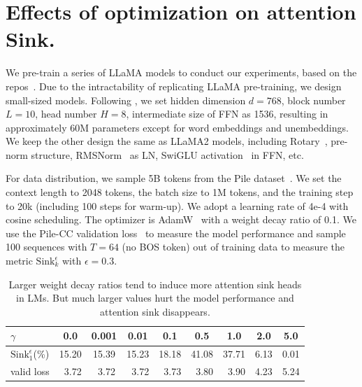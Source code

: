 
\vspace{-0.3cm}
\section{Effects of {\color{cc1}optimization} on attention Sink.}
\vspace{-0.25cm}
\label{sec4}


We pre-train a series of LLaMA models to conduct our experiments, based on the repos~\citep{zhang2024tinyllama,liu2024regmix}. Due to the intractability of replicating LLaMA pre-training, we design small-sized models. Following \citet{liu2024regmix}, we set hidden dimension $d=\textrm{768}$, block number $L=\textrm{10}$, head number $H=\textrm{8}$, intermediate size of FFN as 1536, resulting in approximately 60M parameters except for word embeddings and unembeddings. We keep the other design the same as LLaMA2 models, including Rotary~\citep{su2024roformer}, pre-norm structure, RMSNorm~\citep{zhang2019root} as LN, SwiGLU activation~\citep{shazeer2020glu} in FFN, etc.

For data distribution, we sample 5B tokens from the Pile dataset~\citep{gao2020pile}. We set the context length to 2048 tokens, the batch size to 1M tokens, and the training step to 20k (including 100 steps for warm-up). We adopt a learning rate of 4e-4 with cosine scheduling. The optimizer is AdamW~\citep{loshchilov2017decoupled} with a weight decay ratio of 0.1. We use the Pile-CC validation loss~\citep{gao2020pile,liu2024regmix} to measure the model performance and sample 100 sequences with $T=64$ (no BOS token) out of training data to measure the metric $\textrm{Sink}_k^\epsilon$ with $\epsilon=\textrm{0.3}$.  




\begin{table}[t]
\vspace{-1.1cm}
\caption{Larger weight decay ratios tend to induce more attention sink heads in LMs. But much larger values hurt the model performance and attention sink disappears.}
\vspace{-.4cm}
\begin{center}
\begin{tabular}{l|cccccccc}
\toprule
$\gamma$ & 0.0 & 0.001 & 0.01 & 0.1 & 0.5 & 1.0 & 2.0 & 5.0\\
\midrule
$\textrm{Sink}_1^{\epsilon}$(\%)  & 15.20 & 15.39 & 15.23 & 18.18 & 41.08 & 37.71 & 6.13 &  0.01\\
valid loss & \,\,\,3.72 & \,\,\,3.72 & \,\,\,3.72 & \,\,\,3.73 & \,\,\,3.80  & \,\,\,3.90 &  4.23 & 5.24\\
\bottomrule
\end{tabular}
\end{center}
\vspace{-.5cm}
\label{decay}
\end{table}



